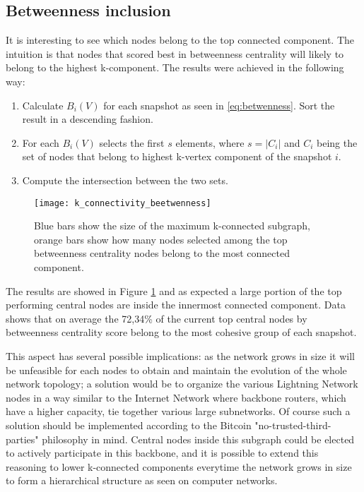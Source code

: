 	\subsection{Betweenness inclusion}
	
	It is interesting to see which nodes belong to the top connected component. The intuition is that nodes that scored best in betweenness centrality will likely to belong to the highest k-component. The results were achieved in the following way:
	\begin{enumerate}
		\item Calculate $B_i(V)$ for each snapshot as seen in \ref{eq:betwenness}. Sort the result in a descending fashion. 
		\item For each $B_i(V)$ selects the first $s$ elements, where $s = |C_i|$ and $C_i$ being the set of nodes that belong to highest k-vertex component of the snapshot $i$.
		\item Compute the intersection between the two sets.
	\end{enumerate}
	
	\begin{figure}
		\texttt{[image: k\_connectivity\_beetwenness]}
		\caption{Blue bars show the size of the maximum k-connected subgraph, orange bars show how many nodes selected among the top betweenness centrality nodes belong to the most connected component.}
		\label{monthyl_k_connectivity_betweenness}
	\end{figure}
	
	The results are showed in Figure \ref{monthyl_k_connectivity_betweenness} and as expected a large portion of the top performing central nodes are inside the innermost connected component. Data shows that on average the 72,34\% of the current top central nodes by betweenness centrality score belong to the most cohesive group of each snapshot.
	
	This aspect has several possible implications: as the network grows in size it will be unfeasible for each nodes to obtain and maintain the evolution of the whole network topology; a solution would be to organize the various Lightning Network nodes in a way similar to the Internet Network where backbone routers, which have a higher capacity, tie together various large subnetworks. Of course such a solution should be implemented according to the Bitcoin "no-trusted-third-parties" philosophy in mind. Central nodes inside this subgraph could be elected to actively participate in this backbone, and it is possible to extend this reasoning to lower k-connected components everytime the network grows in size to form a hierarchical structure as seen on computer networks. 
	
